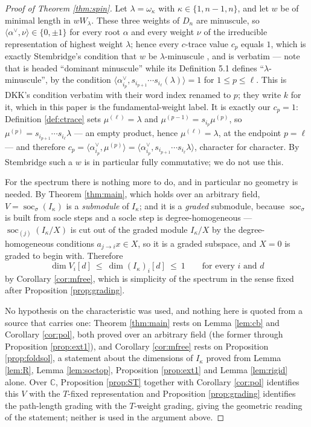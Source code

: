 \documentclass[reqno]{amsart}
\theoremstyle{plain}
\theoremstyle{definition}
\DeclareMathOperator{\soc}{soc}
\newcommand{\la}{\lambda}
\newcommand{\al}{\alpha}
\newcommand{\om}{\omega}
\newcommand{\ka}{\kappa}
\begin{document}
\begin{proof}[Proof of Theorem \ref{thm:spin}]
Let $\la=\om_\ka$ with $\ka\in\{1,n-1,n\}$, and let $w$ be of minimal length
in $wW_\la$.  These three weights of $D_n$ are minuscule, so
$\langle\al^\vee,\nu\rangle\in\{0,\pm1\}$ for every root $\al$ and every
weight $\nu$ of the irreducible representation of highest weight $\la$; hence
every $c$-trace value $c_p$ equals $1$, which
is exactly Stembridge's condition that $w$ be $\la$-minuscule
\cite[\S2]{Stem}, and is \cite[Def.~5.1]{DKK} verbatim --- note that
\cite[\S5.1]{DKK} is headed ``dominant minuscule'' while its Definition 5.1
defines ``$\la$-minuscule'', by the condition
$\langle\al_{i_p}^\vee,s_{i_{p+1}}\cdots s_{i_\ell}(\la)\rangle=1$ for
$1\le p\le\ell$.  This is DKK's condition verbatim with their word index
renamed to $p$; they write $k$ for it, which in this paper is the
fundamental-weight label.  It is exactly our $c_p=1$: Definition
\ref{def:ctrace} sets $\mu^{(\ell)}=\la$ and $\mu^{(p-1)}=s_{i_p}\mu^{(p)}$,
so $\mu^{(p)}=s_{i_{p+1}}\cdots s_{i_\ell}\la$ --- an empty product, hence
$\mu^{(\ell)}=\la$, at the endpoint $p=\ell$ --- and therefore
$c_p=\langle\al_{i_p}^\vee,\mu^{(p)}\rangle
=\langle\al_{i_p}^\vee,s_{i_{p+1}}\cdots s_{i_\ell}\la\rangle$, character for
character.  By Stembridge
\cite[Prop.~2.1]{Stem} such a $w$ is in particular fully commutative; we do not
use this.

For the spectrum there is nothing more to do, and in particular no geometry is
needed.  By Theorem \ref{thm:main}, which holds over an arbitrary field,
$V=\soc_\sigma(I_\ka)$ is a \emph{submodule} of $I_\ka$; and it is a
\emph{graded} submodule, because $\soc_\sigma$ is built from socle steps and a
socle step is degree-homogeneous --- $\soc_{(j)}(I_\ka/X)$ is cut out of the
graded module $I_\ka/X$ by the degree-homogeneous conditions
$a_{j\to i}x\in X$, so it is a graded subspace, and $X=0$ is graded to begin
with.  Therefore
\[
   \dim V_i[d]\ \le\ \dim(I_\ka)_i[d]\ \le\ 1
   \qquad\text{for every } i \text{ and } d
\]
by Corollary \ref{cor:mfree}, which is simplicity of the spectrum in the sense
fixed after Proposition \ref{prop:grading}.

No hypothesis on the characteristic was used, and nothing here is quoted from
a source that carries one: Theorem \ref{thm:main} rests on Lemma \ref{lem:cb}
and Corollary \ref{cor:pol}, both proved over an arbitrary field (the former
through Proposition \ref{prop:ext1}), and Corollary \ref{cor:mfree} rests on
Proposition \ref{prop:foldsol}, a statement about the dimensions of $I_\ka$
proved from Lemma \ref{lem:R}, Lemma \ref{lem:soctop}, Proposition
\ref{prop:ext1} and Lemma \ref{lem:rigid} alone.  Over
$\mathbb{C}$, Proposition \ref{prop:ST} together with Corollary
\ref{cor:pol} identifies this $V$ with the $T$-fixed representation and
Proposition \ref{prop:grading} identifies the path-length grading with the
$T$-weight grading, giving the geometric reading of the statement; neither is
used in the argument above.
\end{proof}
\end{document}
